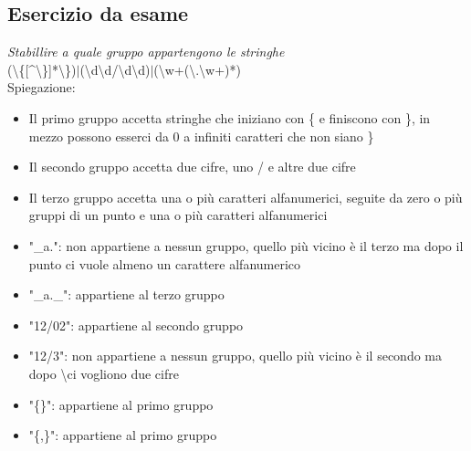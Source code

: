\documentclass[12pt]{article}
\begin{document}
\subsection{Esercizio da esame}
\textit{Stabillire a quale gruppo appartengono le stringhe}\\
(\textbackslash \{[\textasciicircum\textbackslash\}]*\textbackslash\})$|$(\textbackslash d\textbackslash d/\textbackslash d\textbackslash d)$|$(\textbackslash w+(\textbackslash.\textbackslash w+)*)\\
Spiegazione:
\begin{itemize}
    \item Il primo gruppo accetta stringhe che iniziano con \{ e finiscono con \}, in mezzo possono esserci da 0 a infiniti caratteri che non siano \}
    \item Il secondo gruppo accetta due cifre, uno / e altre due cifre
    \item Il terzo gruppo accetta una o più caratteri alfanumerici, seguite da zero o più gruppi di un punto e una o più caratteri alfanumerici
\end{itemize}
\begin{itemize}
    \item "\_a.": non appartiene a nessun gruppo, quello più vicino è il terzo ma dopo il punto ci vuole almeno un carattere alfanumerico
    \item "\_a.\_": appartiene al terzo gruppo
    \item "12/02": appartiene al secondo gruppo
    \item "12/3": non appartiene a nessun gruppo, quello più vicino è il secondo ma dopo \textbackslash ci vogliono due cifre
    \item "\{\}": appartiene al primo gruppo
    \item "\{,\}": appartiene al primo gruppo
\end{itemize}
\end{document}
